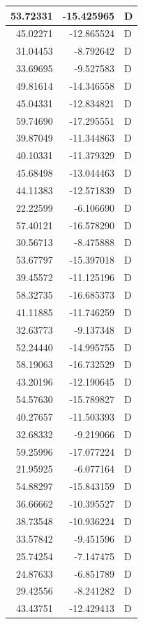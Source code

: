 \documentclass[
  letterpaper,
  DIV=11,
  numbers=noendperiod]{scrartcl}
\begin{document}
\begin{table}
\begin{tabular}[t]{r|r|l}
\hline
53.72331 & -15.425965 & D\\
\hline
45.02271 & -12.865524 & D\\
\hline
31.04453 & -8.792642 & D\\
\hline
33.69695 & -9.527583 & D\\
\hline
49.81614 & -14.346558 & D\\
\hline
45.04331 & -12.834821 & D\\
\hline
59.74690 & -17.295551 & D\\
\hline
39.87049 & -11.344863 & D\\
\hline
40.10331 & -11.379329 & D\\
\hline
45.68498 & -13.044463 & D\\
\hline
44.11383 & -12.571839 & D\\
\hline
22.22599 & -6.106690 & D\\
\hline
57.40121 & -16.578290 & D\\
\hline
30.56713 & -8.475888 & D\\
\hline
53.67797 & -15.397018 & D\\
\hline
39.45572 & -11.125196 & D\\
\hline
58.32735 & -16.685373 & D\\
\hline
41.11885 & -11.746259 & D\\
\hline
32.63773 & -9.137348 & D\\
\hline
52.24440 & -14.995755 & D\\
\hline
58.19063 & -16.732529 & D\\
\hline
43.20196 & -12.190645 & D\\
\hline
54.57630 & -15.789827 & D\\
\hline
40.27657 & -11.503393 & D\\
\hline
32.68332 & -9.219066 & D\\
\hline
59.25996 & -17.077224 & D\\
\hline
21.95925 & -6.077164 & D\\
\hline
54.88297 & -15.843159 & D\\
\hline
36.66662 & -10.395527 & D\\
\hline
38.73548 & -10.936224 & D\\
\hline
33.57842 & -9.451596 & D\\
\hline
25.74254 & -7.147475 & D\\
\hline
24.87633 & -6.851789 & D\\
\hline
29.42556 & -8.241282 & D\\
\hline
43.43751 & -12.429413 & D\\

\end{tabular}
\end{table}
\end{document}
